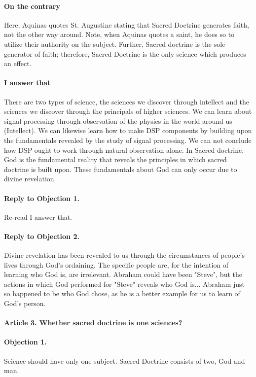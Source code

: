 \documentclass{ucetd}
\begin{document}
\paragraph{On the contrary}
Here, Aquinas quotes St. Augustine stating that Sacred Doctrine generates faith, not the other way around. Note, when Aquinas quotes a saint, he does so to utilize their authority on the subject. Further, Sacred doctrine is the sole generator of faith; therefore, Sacred Doctrine is the only science which produces an effect.
\paragraph{I answer that}
There are two types of science, the sciences we discover through intellect and the sciences we discover through the principals of higher sciences. We can learn about signal processing through observation of the physics in the world around us (Intellect). We can likewise learn how to make DSP components by building upon the fundamentals revealed by the study of signal processing. We can not conclude how DSP ought to work through natural observation alone. In Sacred doctrine, God is the fundamental reality that reveals the principles in which sacred doctrine is built upon. These fundamentals about God can only occur due to divine revelation. 
\paragraph{Reply to Objection 1.}
Re-read I answer that.
\paragraph{Reply to Objection 2.}
Divine revelation has been revealed to us through the circumstances of people's lives through God's ordaining. The specific people are, for the intention of learning who God is, are irrelevant. Abraham could have been "Steve", but the actions in which God performed for "Steve" reveals who God is... Abraham just so happened to be who God chose, as he is a better example for us to learn of God's person.

\paragraph{Article 3. Whether sacred doctrine is one sciences?}
\paragraph{Objection 1.}
Science should have only one subject. Sacred Doctrine consists of two, God and man.
\end{document}
